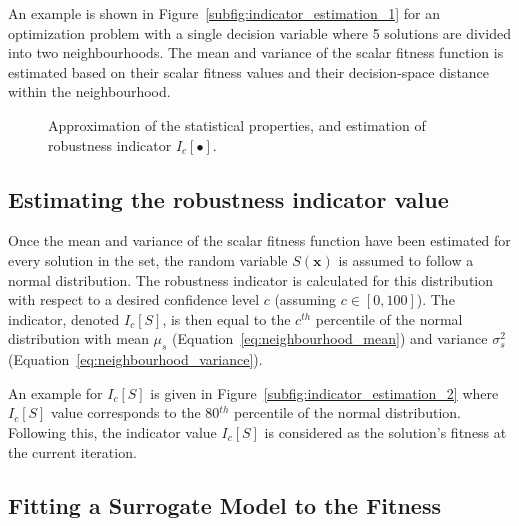 \documentclass{llncs}
\newcommand{\brr}[1]{{\left({#1}\right)}} %
\newcommand{\Ic}[1]{I_c\!\left[{#1}\right]} %
\newcommand{\vx}{\mathbf{x}} %
\begin{document}
An example is shown in Figure~\ref{subfig:indicator_estimation_1} for an optimization problem with a single decision variable where 5 solutions are divided into two neighbourhoods. The mean and variance of the scalar fitness function is estimated based on their scalar fitness values and their decision-space distance within the neighbourhood.

\begin{figure}
\centering
{}
\hspace{1mm}
\caption{Approximation of the statistical properties, and estimation of robustness indicator $\Ic{\bullet}$.}
\label{fig:indicator_estimation}
\end{figure}

\subsection{Estimating the robustness indicator value}\label{subsec:robustness_indicators}

Once the mean and variance of the scalar fitness function have been estimated for every solution in the set, the random variable $S\brr{\vx}$ is assumed to follow a normal distribution. The robustness indicator is calculated for this distribution with respect to a desired confidence level $c$ (assuming $c\in[0,100]$). The indicator, denoted $\Ic{S}$, is then equal to the $c^{th}$ percentile of the normal distribution with mean $\mu_s$ (Equation~\ref{eq:neighbourhood_mean}) and variance $\sigma_s^2$ (Equation~\ref{eq:neighbourhood_variance}).

An example for $\Ic{S}$ is given in Figure~\ref{subfig:indicator_estimation_2} where $\Ic{S}$ value corresponds to the 80$^{th}$ percentile of the normal distribution. Following this, the indicator value $\Ic{S}$ is considered as the solution's fitness at the current iteration.


\subsection{Fitting a Surrogate Model to the Fitness}\label{subsec:Kriging}
\end{document}
